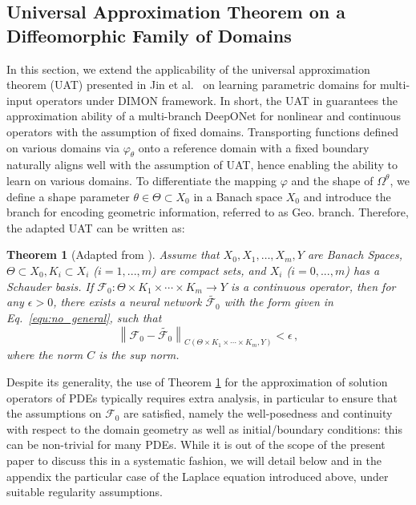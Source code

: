 \documentclass[review]{elsarticle}
\newtheorem{theorem}{Theorem}
\def\Omegatheta{{\Omega^\theta}}
\def\refd{0}
\def\F0{{\mathcal{F}_{\refd}}}
\newcommand\norm[1]{\left\lVert#1\right\rVert}
\begin{document}
\subsection{Universal Approximation Theorem on a Diffeomorphic Family of Domains}
\label{subsec:theorem}

In this section, we extend the applicability of the universal approximation theorem (UAT) presented in Jin et al.~\cite{jin2022mionet} on learning parametric domains for multi-input operators under DIMON framework. In short, the UAT in \cite{jin2022mionet} guarantees the approximation ability of a multi-branch DeepONet for nonlinear and continuous operators with the assumption of fixed domains. Transporting functions defined on various domains via $\varphi_{\theta}$ onto a reference domain with a fixed boundary naturally aligns well with the assumption of UAT, hence enabling the ability to learn on various domains. To differentiate the mapping $\varphi$ and the shape of $\Omegatheta$, we define a shape parameter $\theta \in \Theta \subset X_{0}$ in a Banach space $X_{0}$ and introduce the branch for encoding geometric information, referred to as Geo. branch. Therefore, the adapted UAT can be written as:

\begin{theorem}[Adapted from \cite{jin2022mionet}] 
\label{thm:universal_approx}
Assume that $X_{0}, X_{1},\dots,X_{m}, Y$ are Banach Spaces, $\Theta \subset X_{0}, K_{i}\subset X_{i}$ ($i=1,...,m$) are compact sets, and $X_{i}$ ($i=0,...,m$) has a Schauder basis. If $\F0: \Theta \times K_{1}\times \cdots \times K_{m}\rightarrow Y$ is a continuous operator, then for any $\epsilon>0$, there exists a neural network $\tilde{\F0}$ with the form given in Eq.~\eqref{equ:no_general}, such that 
$$\norm{\F0-\tilde{\F0}}_{C(\Theta \times K_1\times\cdots\times K_m,Y)}<\epsilon\,,$$
where the norm $C$ is the sup norm.
\end{theorem}
Despite its generality, the use of Theorem \ref{thm:universal_approx} for the approximation of solution operators of PDEs typically requires extra analysis, in particular to ensure that the assumptions on $\F0$ are satisfied, namely the well-posedness and continuity with respect to the domain geometry as well as initial/boundary conditions: this can be non-trivial for many PDEs. While it is out of the scope of the present paper to discuss this in a systematic fashion, we will detail below and in the appendix the particular case of the Laplace equation introduced above, under suitable regularity assumptions. 
\end{document}
